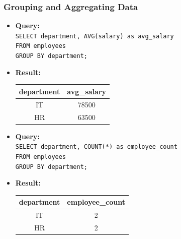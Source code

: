 \documentclass[10pt]{beamer}
\begin{document}
\begin{frame}[fragile]
  \frametitle{Grouping and Aggregating Data}
  \begin{itemize}
    \item \textbf{Query:} \\
    \texttt{SELECT department, AVG(salary) as avg\_salary} \\
    \texttt{FROM employees} \\
    \texttt{GROUP BY department;}
    
    \item \textbf{Result:}
    \begin{center}
      \begin{tabular}{|c|c|}
        \hline
        \textbf{department} & \textbf{avg\_salary} \\
        \hline
        IT & 78500 \\
        HR & 63500 \\
        \hline
      \end{tabular}
    \end{center}
  \end{itemize}
  
  \vspace{0.5em}
  \begin{itemize}
    \item \textbf{Query:} \\
    \texttt{SELECT department, COUNT(*) as employee\_count} \\
    \texttt{FROM employees} \\
    \texttt{GROUP BY department;}
    
    \item \textbf{Result:}
    \begin{center}
      \begin{tabular}{|c|c|}
        \hline
        \textbf{department} & \textbf{employee\_count} \\
        \hline
        IT & 2 \\
        HR & 2 \\
        \hline
      \end{tabular}
    \end{center}
  \end{itemize}
\end{frame}
\end{document}
